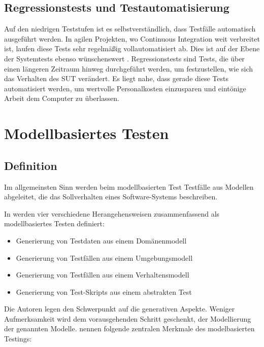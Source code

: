 \subsection{Regressionstests und Testautomatisierung}
\label{sec:regressionstests}
Auf den niedrigen Teststufen ist es selbstverständlich, dass Testfälle automatisch ausgeführt werden. In agilen Projekten, wo Continuous Integration weit verbreitet ist, laufen diese Tests sehr regelmäßig vollautomatisiert ab. Dies ist auf der Ebene der Systemtests ebenso wünschenswert \cite{linz_testing_2014}. Regressionstests sind Tests, die über einen längeren Zeitraum hinweg durchgeführt werden, um festzustellen, wie sich das Verhalten des \Gls{SUT} verändert. Es liegt nahe, dass gerade diese Tests automatisiert werden, um wertvolle Personalkosten einzusparen und eintönige Arbeit dem Computer zu überlassen.

\section{Modellbasiertes Testen}
\label{sec:mbt}
\subsection{Definition}
Im allgemeinsten Sinn werden beim modellbasierten Test Testfälle aus Modellen abgeleitet, die das Sollverhalten eines Software-Systems beschreiben.

In  \cite{utting_practical_2007} werden vier verschiedene Herangehensweisen zusammenfassend als modellbasiertes Testen definiert:

\begin{itemize}
\item Generierung von Testdaten aus einem Domänenmodell
\item Generierung von Testfällen aus einem Umgebungsmodell
\item Generierung von Testfällen aus einem Verhaltensmodell
\item Generierung von Test-Skripts aus einem abstrakten Test
\end{itemize}

Die Autoren legen den Schwerpunkt auf die generativen Aspekte. Weniger Aufmerksamkeit wird dem vorausgehenden Schritt geschenkt, der Modellierung der genannten Modelle. \citeauthor{rossner_basiswissen_2010} \cite{rossner_basiswissen_2010} nennen folgende zentralen Merkmale des modelbasierten Testings:

